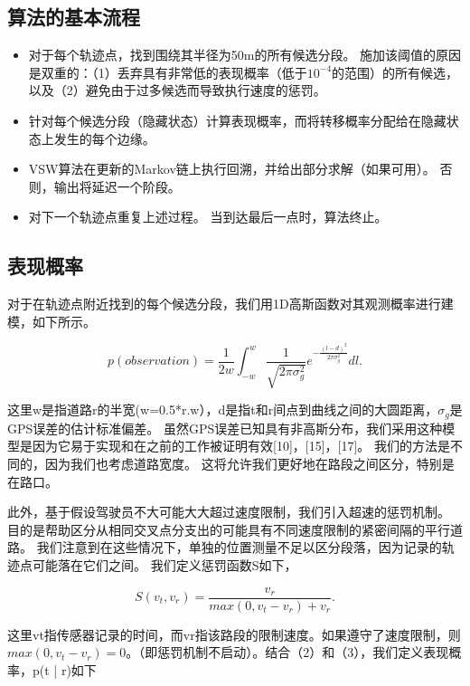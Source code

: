 \subsection{算法的基本流程}
\begin{itemize}
\item 对于每个轨迹点，找到围绕其半径为50m的所有候选分段。 施加该阈值的原因是双重的：（1）丢弃具有非常低的表现概率（低于$10^{-4}$的范围）的所有候选，以及（2）避免由于过多候选而导致执行速度的惩罚。

\item 针对每个候选分段（隐藏状态）计算表现概率，而将转移概率分配给在隐藏状态上发生的每个边缘。

\item VSW算法在更新的Markov链上执行回溯，并给出部分求解（如果可用）。 否则，输出将延迟一个阶段。

\item 对下一个轨迹点重复上述过程。 当到达最后一点时，算法终止。
\end{itemize}

\subsection{表现概率}
对于在轨迹点附近找到的每个候选分段，我们用1D高斯函数对其观测概率进行建模，如下所示。

\begin{equation*}
p(observation)=\frac{1}{2w}{\int_{-w}^{w}}\frac{1}{\sqrt{2\pi\sigma_{g}^{2}}}e^{-\frac{(l-d)^{2}}{2\pi\sigma_{g}^{2}}}dl.
\end{equation*}

这里w是指道路r的半宽(w=0.5*r.w），d是指t和r间点到曲线之间的大圆距离，$\sigma_{g}$是GPS误差的估计标准偏差。 虽然GPS误差已知具有非高斯分布，我们采用这种模型是因为它易于实现和在之前的工作被证明有效[10]，[15]，[17]。 我们的方法是不同的，因为我们也考虑道路宽度。 这将允许我们更好地在路段之间区分，特别是在路口。

此外，基于假设驾驶员不大可能大大超过速度限制，我们引入超速的惩罚机制。 目的是帮助区分从相同交叉点分支出的可能具有不同速度限制的紧密间隔的平行道路。 我们注意到在这些情况下，单独的位置测量不足以区分段落，因为记录的轨迹点可能落在它们之间。 我们定义惩罚函数S如下，

\begin{equation*}
S(v_{t},v_{r})=\frac{v_{r}}{max(0,v_{t}-v_{r})+v_{r}}.
\end{equation*}

这里vt指传感器记录的时间，而vr指该路段的限制速度。如果遵守了速度限制，则$max(0,v_{t}-v_{r})=0$。（即惩罚机制不启动）。结合（2）和（3），我们定义表现概率，p(t | r)如下

